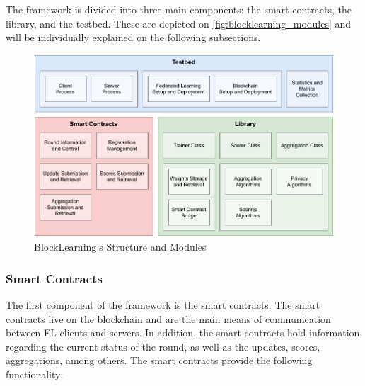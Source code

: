The framework is divided into three main components: the smart contracts, the library, and the testbed. These are depicted on \autoref{fig:blocklearning_modules} and will be individually explained on the following subsections.

\begin{figure}[!ht]
    \centering
    \includegraphics[width=1\textwidth]{graphics/modules.pdf}
    \caption{BlockLearning's  Structure and Modules}
    \label{fig:blocklearning_modules}
\end{figure}

\subsubsection{Smart Contracts}\label{meth:smart_contracts}

The first component of the framework is the smart contracts. The smart contracts live on the blockchain and are the main means of communication between FL clients and servers. In addition, the smart contracts hold information regarding the current status of the round, as well as the updates, scores, aggregations, among others. The smart contracts provide the following functionality:

